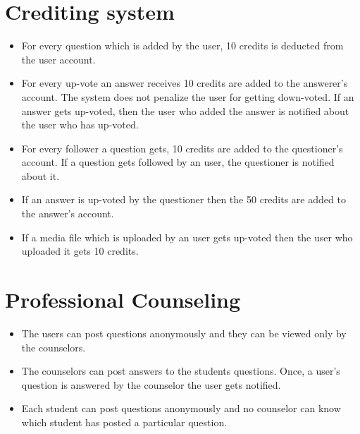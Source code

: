 \documentclass{article}
\begin{document}
\section{Crediting system}
\begin{itemize}
\item For every question which is added by the user, 10 credits is deducted from the user account.
\item For every up-vote an answer receives 10 credits are added to the answerer's account. The system does not penalize the user for getting down-voted. If an answer gets up-voted, then the user who added the answer is notified about the user who has up-voted. 
\item For every follower a question gets, 10 credits are added to the questioner's account. If a question gets followed by an user, the questioner is notified about it.
\item If an answer is up-voted by the questioner then the 50 credits are added to the answer's account.
\item If a media file which is uploaded by an user gets up-voted then the user who uploaded it gets 10 credits.
\end{itemize}

\section{Professional Counseling}
\begin{itemize}
\item The users can post questions anonymously and they can be viewed only by the counselors.
\item The counselors can post answers to the students questions. Once, a user's question is answered by the counselor the user gets notified. 
\item Each student can post questions anonymously and no counselor can know which student has posted a particular question. 
\end{itemize}
\end{document}

